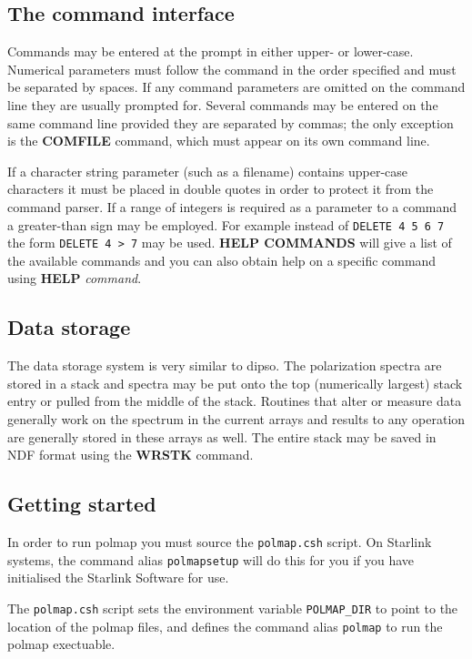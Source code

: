 \subsection{The command interface}

Commands may be entered at the prompt in either upper- or lower-case.
Numerical parameters must follow the command in the order specified and
must be separated by spaces. If any command parameters are omitted on
the command line they are usually prompted for. Several commands may be
entered on the same command line provided they are separated by commas;
the only exception is the {\bf COMFILE} command, which must appear on
its own command line.

If a character string parameter (such as a filename) contains
upper-case characters it must be placed in double quotes in order to
protect it from the command parser. If a range of integers is required
as a parameter to a command a greater-than sign may be employed. For
example instead of {\tt DELETE 4 5 6 7} the form {\tt DELETE 4 > 7} may
be used. {\bf HELP COMMANDS} will give a list of the available commands
and you can also obtain help on a specific command using {\bf HELP}
{\it command}.

\subsection{Data storage}

The data storage system is very similar to {\sc dipso}. The polarization
spectra are stored in a stack and spectra may be put onto the top
(numerically largest) stack entry or pulled from the middle of the stack.
Routines that alter or measure data generally work on the spectrum in the
current arrays and results to any operation are generally stored in these
arrays as well. The entire stack may be saved in NDF format using the {\bf
WRSTK} command.

\subsection{Getting started}

In order to run {\sc polmap} you must source the {\tt polmap.csh} script.
On Starlink systems, the command alias {\tt polmapsetup} will do this
for you if you have initialised the Starlink Software for use.

The {\tt polmap.csh} script sets the environment variable {\tt POLMAP\_DIR}
to point to the location of the {\sc polmap} files, and defines the
command alias {\tt polmap} to run the {\sc polmap} exectuable.

